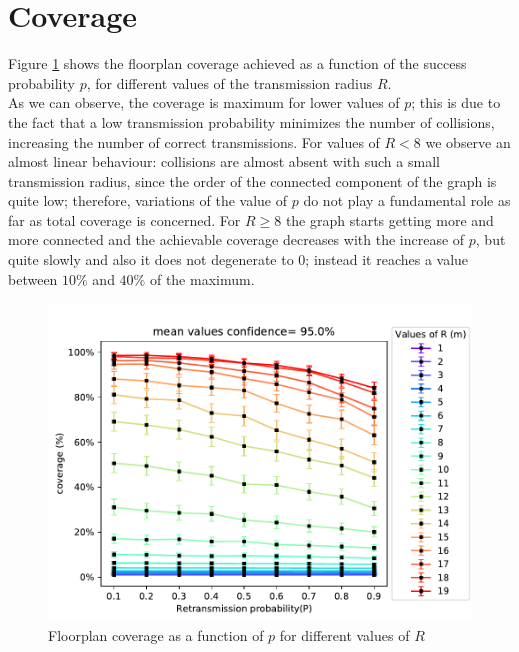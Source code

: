 \section{Coverage}\label{ssec:coverage}
Figure \ref{fig:coveragePR} shows the floorplan coverage achieved as a function
of the success probability $p$, for different values of the transmission radius
$R$.\\
As we can observe, the coverage is maximum for lower values of $p$; this is due
to the fact that a low transmission probability minimizes the number of
collisions, increasing the number of correct transmissions. For values of
$R < 8$ we observe an almost linear behaviour: collisions are almost absent
with such a small transmission radius, since the order of the connected
component of the graph is quite low; therefore, variations of the value of $p$
do not play a fundamental role as far as total coverage is concerned. For
$R \geq 8$ the graph starts getting more and more connected and the achievable
coverage decreases with the increase of $p$, but quite slowly and also it does
not degenerate to $0$; instead it reaches a value between $10$\% and $40$\% of
the maximum.
\begin{figure}[H]
    \begin{center}
        \includegraphics[scale=.62,trim={0 0 0 0.8cm},clip]{img/big_coverage_p_mean_95.0.pdf}
    \end{center}
    \vspace*{-0.5cm}
    \caption{Floorplan coverage as a function of $p$ for different values of $R$}
    \label{fig:coveragePR}
\end{figure}
